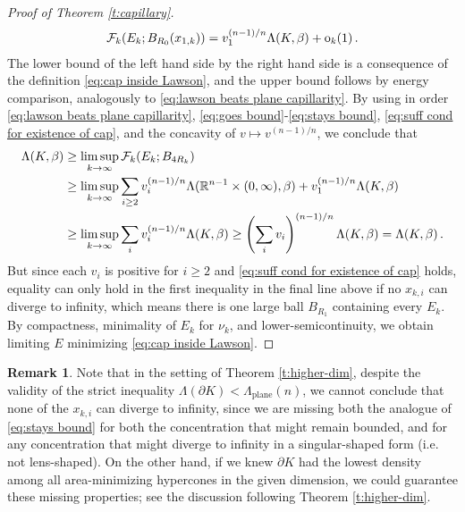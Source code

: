 \documentclass[10pt,reqno]{amsart}
\numberwithin{equation}{section}
\theoremstyle{definition}
\newtheorem{remark}[theorem]{Remark}
\DeclareMathOperator{\plane}{plane}
\begin{document}
{{\begin{proof}[Proof of Theorem \ref{t:capillary}]
\begin{align}\label{eq:stays bound}
    \mathcal{F}_k(E_k;B_{R_0}(x_{1,k})) = 
v_1^{(n-1)/n} \Lambda(K,\beta)+{\rm o}_k(1)\,.
\end{align}
The lower bound of the left hand side by the right hand side is a consequence of the definition \eqref{eq:cap inside Lawson}, and the upper bound follows by energy comparison, analogously to \eqref{eq:lawson beats plane capillarity}. By using in order \eqref{eq:lawson beats plane capillarity}, \eqref{eq:goes bound}-\eqref{eq:stays bound}, \eqref{eq:suff cond for existence of cap}, and the concavity of $v\mapsto v^{(n-1)/n}$, we conclude that 
\begin{align}\notag
   \Lambda(K,\beta)&\geq \limsup_{k\to \infty}\mathcal{F}_k(E_k;B_{4R_k})\\ \notag
   &\geq \limsup_{k\to \infty}\sum_{i\geq 2} v_i^{(n-1)/n}\Lambda(\mathbb{R}^{n-1}\times (0,\infty),\beta) + v_1^{(n-1)/n} \Lambda(K,\beta)\\ \notag
   &\geq \limsup_{k\to \infty}\sum_{i} v_i^{(n-1)/n}\Lambda(K,\beta) \geq \left( \sum_i v_i\right)^{(n-1)/n}\Lambda(K,\beta) = \Lambda(K,\beta)\,.
\end{align}
But since each $v_i$ is positive for $i\geq 2$ and \eqref{eq:suff cond for existence of cap} holds, equality can only hold in the first inequality in the final line above if no $x_{k,i}$ can diverge to infinity, which means there is one large ball $B_{R_1}$ containing every $E_k$. By compactness, minimality of $E_k$ for $\nu_k$, and lower-semicontinuity, we obtain limiting $E$ minimizing \eqref{eq:cap inside Lawson}. 
\end{proof}

\begin{remark}
    Note that in the setting of Theorem \ref{t:higher-dim}, despite the validity of the strict inequality $\Lambda(\partial K) < \Lambda_{\plane}(n)$, we cannot conclude that none of the $x_{k,i}$ can diverge to infinity, since we are missing both the analogue of \eqref{eq:stays bound} for both the concentration that might remain bounded, and for any concentration that might diverge to infinity in a singular-shaped form (i.e. not lens-shaped). On the other hand, if we knew $\partial K$ had the lowest density among all area-minimizing hypercones in the given dimension, we could guarantee these missing properties; see the discussion following Theorem \ref{t:higher-dim}.
\end{remark}

}}
\end{document}
